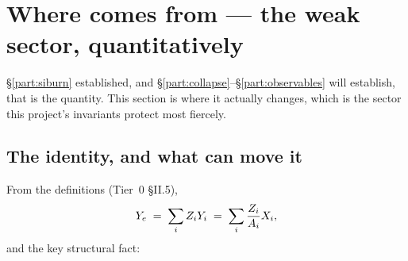 %

\section{Where \texorpdfstring{\Ye}{Ye} comes from --- the weak sector, quantitatively}
\label{part:weak}

\S\ref{part:siburn} established, and \S\ref{part:collapse}--\S\ref{part:observables}
will establish, that \Ye{} is the quantity. This section is where it actually
changes, which is the sector this project's invariants protect most fiercely.

\subsection{The identity, and what can move it}
\label{sec:yeidentity}

From the definitions (Tier~0 \S II.5),
%
\begin{equation}
Y_{e} \;=\; \sum_i Z_i Y_i \;=\; \sum_i \frac{Z_i}{A_i}X_i ,
\label{eq:yeidentity}
\end{equation}
%
and the key structural fact:

